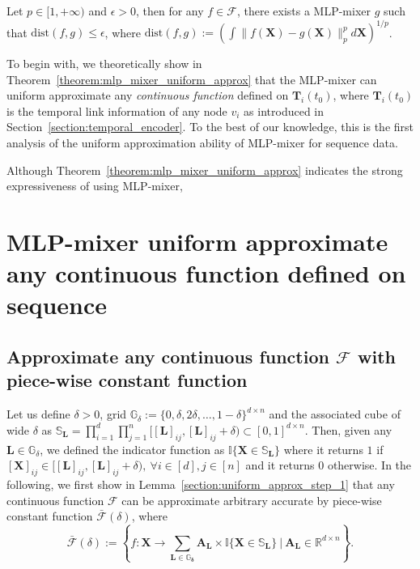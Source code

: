 \begin{theorem}  \label{theorem:mlp_mixer_uniform_approx}
Let $p\in[1, +\infty)$ and $\epsilon >0$, then for any $f\in\mathcal{F}$, there exists a MLP-mixer $g$ such that $\text{dist}(f,g) \leq \epsilon$, where $\text{dist}(f,g) := (\int \| f(\mathbf{X}) - g(\mathbf{X}) \|_p^p d\mathbf{X})^{1/p}$.
\end{theorem}

To begin with, we theoretically show in Theorem~\ref{theorem:mlp_mixer_uniform_approx} that the MLP-mixer can uniform approximate any \textit{continuous function} defined on $\mathbf{T}_i(t_0)$, where $\mathbf{T}_i(t_0)$ is the temporal link information of any node $v_i$ as introduced in Section~\ref{section:temporal_encoder}.
To the best of our knowledge, this is the first analysis of the uniform approximation ability of MLP-mixer for sequence data.


Although Theorem~\ref{theorem:mlp_mixer_uniform_approx} indicates the strong expressiveness of using MLP-mixer,

\section{MLP-mixer uniform approximate any continuous function defined on sequence}

\subsection{Approximate any continuous function $\mathcal{F}$ with piece-wise constant function}

Let us define $\delta > 0$, grid $\mathbb{G}_\delta := \{0, \delta, 2\delta,\ldots, 1-\delta\}^{d\times n}$ and the associated cube of wide $\delta$ as $\mathbb{S}_\mathbf{L} = \prod_{i=1}^d \prod_{j=1}^n [[\mathbf{L}]_{ij}, [\mathbf{L}]_{ij}+ \delta) \subset [0, 1]^{d\times n}$.
Then, given any $\mathbf{L} \in \mathbb{G}_\delta$, we defined the indicator function as $\mathbb{I}\{\mathbf{X} \in \mathbb{S}_\mathbf{L}\}$ where it returns $1$ if $[\mathbf{X}]_{ij} \in [[\mathbf{L}]_{ij}, [\mathbf{L}]_{ij}+\delta),~\forall i\in[d], j\in[n]$ and it returns $0$ otherwise. 
In the following, we first show in Lemma~\ref{section:uniform_approx_step_1} that any continuous function $\mathcal{F}$ can be approximate arbitrary accurate by piece-wise constant function $\bar{\mathcal{F}}(\delta)$, where
\begin{equation*}
    \bar{\mathcal{F}}(\delta) := \left\{ f: \mathbf{X} \rightarrow \sum_{\mathbf{L \in \mathbb{G}_\delta}} \mathbf{A}_\mathbf{L} \times \mathbb{I}\{\mathbf{X} \in \mathbb{S}_\mathbf{L}\}~|~\mathbf{A}_\mathbf{L} \in \mathbb{R}^{d\times n}\right\}.
\end{equation*}


